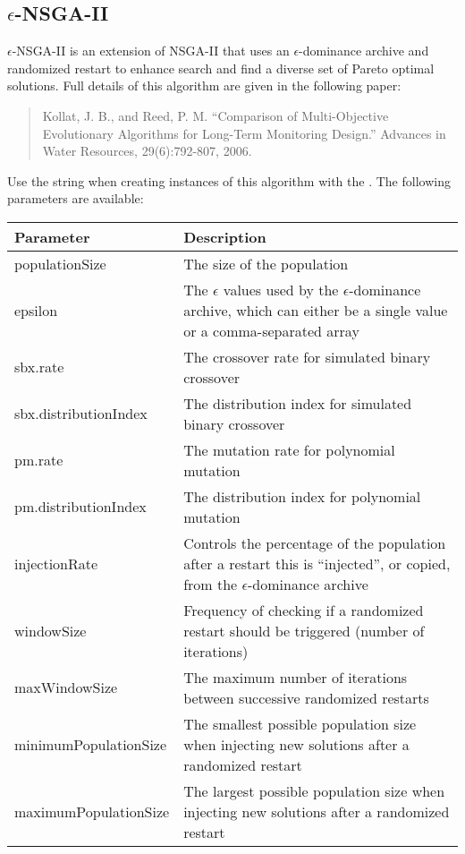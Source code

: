 \subsection{$\epsilon$-NSGA-II}
$\epsilon$-NSGA-II is an extension of NSGA-II that uses an $\epsilon$-dominance archive and randomized restart to enhance search and find a diverse set of Pareto optimal solutions.  Full details of this algorithm are given in the following paper:
\begin{quote}
Kollat, J. B., and Reed, P. M. ``Comparison of Multi-Objective Evolutionary Algorithms for Long-Term Monitoring Design.''  Advances in Water Resources, 29(6):792-807, 2006.
\end{quote}
Use the string  when creating instances of this algorithm with the .  The following parameters are available:
\newline
\newline
\begin{tabularx}{\linewidth}{lX}
  \hline
  Parameter & Description \\
  \hline
  populationSize & The size of the population \\
  epsilon & The $\epsilon$ values used by the $\epsilon$-dominance archive, which can either be a single value or a comma-separated array \\
  sbx.rate & The crossover rate for simulated binary crossover \\
  sbx.distributionIndex & The distribution index for simulated binary crossover \\
  pm.rate & The mutation rate for polynomial mutation \\
  pm.distributionIndex & The distribution index for polynomial mutation \\
  injectionRate & Controls the percentage of the population after a restart this is ``injected'', or copied, from the $\epsilon$-dominance archive \\
  windowSize & Frequency of checking if a randomized restart should be triggered (number of iterations) \\
  maxWindowSize & The maximum number of iterations between successive randomized restarts \\
  minimumPopulationSize & The smallest possible population size when injecting new solutions after a randomized restart \\
  maximumPopulationSize & The largest possible population size when injecting new solutions after a randomized restart \\
  \hline
\end{tabularx}
